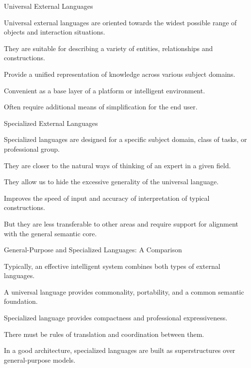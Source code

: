 \begin{frame}{Universal External Languages}
	\topline
	\justifying
	
	Universal external languages are oriented towards the widest possible range of objects and interaction situations.
	
	\begin{textitemize}
		\item They are suitable for describing a variety of entities, relationships and constructions.
		\item Provide a unified representation of knowledge across various subject domains.
		\item Convenient as a base layer of a platform or intelligent environment.
		\item Often require additional means of simplification for the end user.
	\end{textitemize}
\end{frame}

\begin{frame}{Specialized External Languages}
	\topline
	\justifying
	
	Specialized languages are designed for a specific subject domain, class of tasks, or professional group.
	
	\begin{textitemize}
		\item They are closer to the natural ways of thinking of an expert in a given field.
		\item They allow us to hide the excessive generality of the universal language.
		\item Improves the speed of input and accuracy of interpretation of typical constructions.
		\item But they are less transferable to other areas and require support for alignment with the general semantic core.
	\end{textitemize}
\end{frame}

\begin{frame}{General-Purpose and Specialized Languages: A Comparison}
	\topline
	\justifying
	
	Typically, an effective intelligent system combines both types of external languages.
	
	\begin{textitemize}
		\item A universal language provides commonality, portability, and a common semantic foundation.
		\item Specialized language provides compactness and professional expressiveness.
		\item There must be rules of translation and coordination between them.
		\item In a good architecture, specialized languages are built as superstructures over general-purpose models.
	\end{textitemize}
\end{frame}

